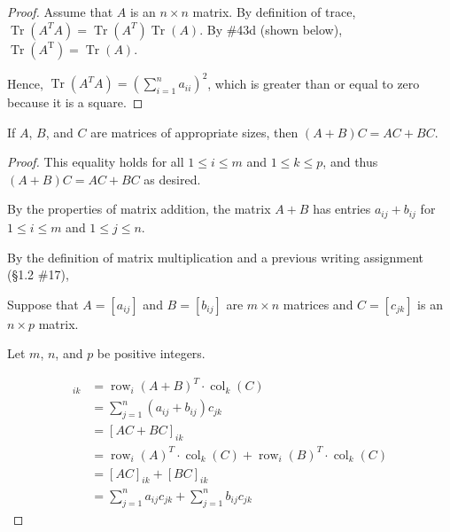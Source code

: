 \documentclass{amsart}
\DeclareMathOperator{\Row}{row}
\DeclareMathOperator{\Col}{col}
\DeclareMathOperator{\trace}{Tr}
\begin{document}
\begin{proof} 
Assume that $A$ is an $n \times n$ matrix. By definition of trace, $\trace(A^{T}A) = \trace(A^{T})\trace(A)$.  By \#43d (shown below), $\trace(A^{\text{T}}) =\trace(A)$.

Hence, $\trace(A^{T}A) = \left( \sum_{i=1}^n a_{ii} \right)^2$, which is greater than or equal to zero because it is a square.
\end{proof}




\begin{prop*}


\end{prop*}





\begin{prop*}[\S1.4, \#4(b)] 
If $A$, $B$, and $C$ are matrices of appropriate sizes, then $(A+B)C = AC + BC$.
\end{prop*}


\begin{proof}
This equality holds for all $1 \leq i \leq m$ and $1 \leq k \leq p$, and thus $(A+B)C = AC + BC$ as desired.\textbf{}

By the properties of matrix addition, the matrix $A+B$ has entries $a_{ij} + b_{ij}$ for $1 \leq i \leq m$ and $1 \leq j \leq n$.

By the definition of matrix multiplication and a previous writing assignment (\S1.2 \#17),

Suppose that $A = [a_{ij}]$ and $B = [b_{ij}]$ are $m\times n$ matrices and $C = [c_{jk}]$ is an $n \times p$ matrix.

Let $m$, $n$, and $p$ be positive integers.

\begin{align*}
[(A+B)C]_{ik} 
    &= \Row_{i}(A+B)^T \cdot \Col_{k}(C) \\
    &= \sum_{j = 1}^n (a_{ij} + b_{ij})c_{jk}\\
    &= [AC + BC]_{ik}\\
    &= \Row_{i}(A)^T\cdot \Col_k(C) + \Row_{i}(B)^T \cdot \Col_k(C)\\
    &= [AC]_{ik} + [BC]_{ik}\\
    &= \sum_{j = 1}^n a_{ij}c_{jk} + \sum_{j = 1}^n b_{ij}c_{jk}
\end{align*}
\end{proof}
\end{document}
